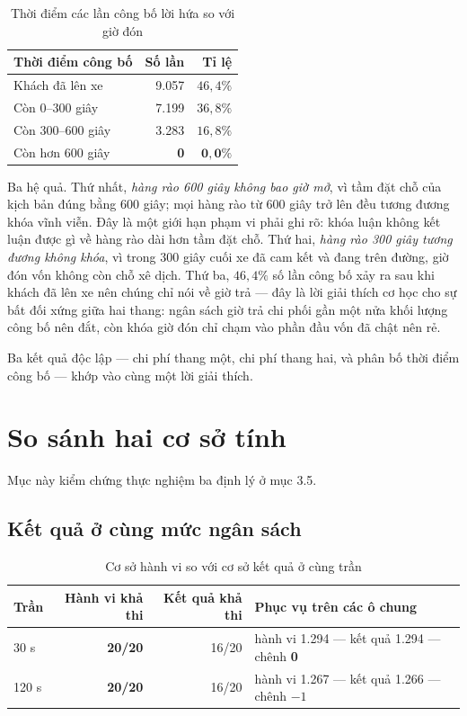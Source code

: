 \begin{table}[htbp]
\centering
\caption{Thời điểm các lần công bố lời hứa so với giờ đón}
\label{bang:thoidiem}
\small
\begin{tabular}{@{}lrr@{}}
\toprule
\textbf{Thời điểm công bố} & \textbf{Số lần} & \textbf{Tỉ lệ}\\
\midrule
Khách đã lên xe & 9.057 & $46{,}4\%$\\
Còn 0--300 giây & 7.199 & $36{,}8\%$\\
Còn 300--600 giây & 3.283 & $16{,}8\%$\\
Còn hơn 600 giây & \textbf{0} & $\mathbf{0{,}0\%}$\\
\bottomrule
\end{tabular}
\end{table}

Ba hệ quả. Thứ nhất, \emph{hàng rào 600 giây không bao giờ mở}, vì tầm đặt chỗ của kịch bản đúng
bằng 600 giây; mọi hàng rào từ 600 giây trở lên đều tương đương khóa vĩnh viễn. Đây là một giới
hạn phạm vi phải ghi rõ: khóa luận không kết luận được gì về hàng rào dài hơn tầm đặt chỗ. Thứ
hai, \emph{hàng rào 300 giây tương đương không khóa}, vì trong 300 giây cuối xe đã cam kết và
đang trên đường, giờ đón vốn không còn chỗ xê dịch. Thứ ba, $46{,}4\%$ số lần công bố xảy ra sau
khi khách đã lên xe nên chúng chỉ nói về giờ trả --- đây là lời giải thích cơ học cho sự bất đối
xứng giữa hai thang: ngân sách giờ trả chi phối gần một nửa khối lượng công bố nên đắt, còn khóa
giờ đón chỉ chạm vào phần đầu vốn đã chật nên rẻ.

Ba kết quả độc lập --- chi phí thang một, chi phí thang hai, và phân bố thời điểm công bố ---
khớp vào cùng một lời giải thích.

\section{So sánh hai cơ sở tính}
\label{muc:haicoso}

Mục này kiểm chứng thực nghiệm ba định lý ở mục 3.5.

\subsection{Kết quả ở cùng mức ngân sách}

\begin{table}[htbp]
\centering
\caption{Cơ sở hành vi so với cơ sở kết quả ở cùng trần}
\label{bang:coso}
\small
\begin{tabular}{@{}lrrl@{}}
\toprule
\textbf{Trần} & \textbf{Hành vi khả thi} & \textbf{Kết quả khả thi} & \textbf{Phục vụ trên các ô chung}\\
\midrule
30 s & \textbf{20/20} & 16/20 & hành vi 1.294 --- kết quả 1.294 --- chênh \textbf{0}\\
120 s & \textbf{20/20} & 16/20 & hành vi 1.267 --- kết quả 1.266 --- chênh $-1$\\
\bottomrule
\end{tabular}
\end{table}

